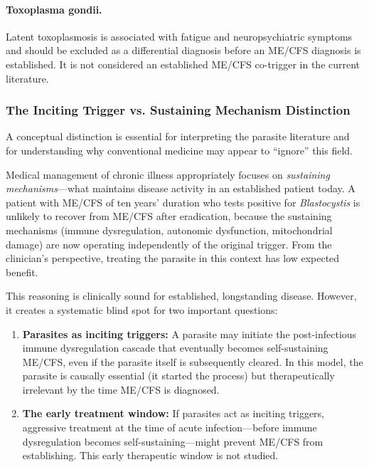 \paragraph{Toxoplasma gondii.}
Latent toxoplasmosis is associated with fatigue and neuropsychiatric symptoms and should be excluded as a differential diagnosis before an ME/CFS diagnosis is established. It is not considered an established ME/CFS co-trigger in the current literature.

\subsubsection{The Inciting Trigger vs. Sustaining Mechanism Distinction}

A conceptual distinction is essential for interpreting the parasite literature and for understanding why conventional medicine may appear to ``ignore'' this field.

Medical management of chronic illness appropriately focuses on \emph{sustaining mechanisms}---what maintains disease activity in an established patient today. A patient with ME/CFS of ten years' duration who tests positive for \emph{Blastocystis} is unlikely to recover from ME/CFS after eradication, because the sustaining mechanisms (immune dysregulation, autonomic dysfunction, mitochondrial damage) are now operating independently of the original trigger. From the clinician's perspective, treating the parasite in this context has low expected benefit.

This reasoning is clinically sound for established, longstanding disease. However, it creates a systematic blind spot for two important questions:

\begin{enumerate}
    \item \textbf{Parasites as inciting triggers:} A parasite may initiate the post-infectious immune dysregulation cascade that eventually becomes self-sustaining ME/CFS, even if the parasite itself is subsequently cleared. In this model, the parasite is causally essential (it started the process) but therapeutically irrelevant by the time ME/CFS is diagnosed.
    \item \textbf{The early treatment window:} If parasites act as inciting triggers, aggressive treatment at the time of acute infection---before immune dysregulation becomes self-sustaining---might prevent ME/CFS from establishing. This early therapeutic window is not studied.
\end{enumerate}

